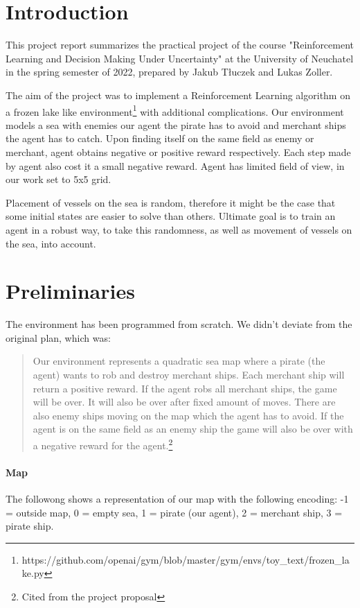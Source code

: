 \documentclass[a4paper,11pt]{article}
\theoremstyle{definition}
\begin{document}
\newpage
\pagestyle{plain}


\section{Introduction}
This project report summarizes the practical project of the course "Reinforcement Learning and Decision Making Under Uncertainty" at the University of Neuchatel in the spring semester of 2022, prepared by Jakub Tłuczek and Lukas Zoller.

The aim of the project was to implement a Reinforcement Learning algorithm on a frozen lake like environment\footnote{https://github.com/openai/gym/blob/master/gym/envs/toy\_text/frozen\_lake.py} with additional complications. Our environment models a sea with enemies our agent the pirate has to avoid and merchant ships the agent has to catch. Upon finding itself on the same field as enemy or merchant, agent obtains negative or positive reward respectively. Each step made by agent also cost it a small negative reward. Agent has limited field of view, in our work set to 5x5 grid.

Placement of vessels on the sea is random, therefore it might be the case that some initial states are easier to solve than others. Ultimate goal is to train an agent in a robust way, to take this randomness, as well as movement of vessels on the sea, into account.

\section{Preliminaries}
The environment has been programmed from scratch. We didn't deviate from the original plan, which was:


\begin{quote}
Our environment represents a quadratic sea map where a pirate (the agent) wants to rob and destroy merchant ships. Each merchant ship will return a positive reward. If the agent robs all merchant ships, the game will be over. It will also be over after fixed amount of moves. There are also enemy ships moving on the map which the agent has to avoid. If the agent is on the same field as an enemy ship the game will also be over with a negative reward for the agent.\footnote{Cited from the project proposal}
\end{quote}

\clearpage

\paragraph{Map}
The followong shows a representation of our map with the following encoding: -1 = outside map, 0 = empty sea, 1 = pirate (our agent), 2 = merchant ship, 3 = pirate ship.
\end{document}
